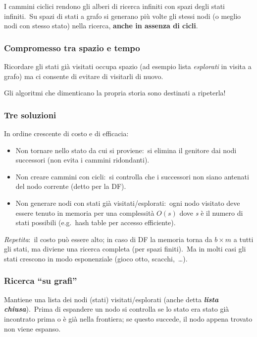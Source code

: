I cammini ciclici rendono gli alberi di ricerca infiniti con spazi degli stati infiniti.\
Su spazi di stati a grafo si generano più volte gli stessi nodi (o meglio nodi con stesso stato) nella ricerca, \textbf{anche in assenza di cicli}.\

\subsubsection{Compromesso tra spazio e tempo}
Ricordare gli stati già visitati occupa spazio (ad esempio lista \textit{esplorati} in visita a grafo) ma ci consente di evitare di visitarli di nuovo.\

Gli algoritmi che dimenticano la propria storia sono destinati a ripeterla!

\subsubsection{Tre soluzioni}

In ordine crescente di costo e di efficacia:
\begin{itemize}
	\item Non tornare nello stato da cui si proviene:\ si elimina il genitore dai nodi successori (non evita i cammini ridondanti).
	\item Non creare cammini con cicli:\ si controlla che i successori non siano antenati del nodo corrente (detto per la DF).
	\item Non generare nodi con stati già visitati{\slash}esplorati:\ ogni nodo visitato deve essere tenuto in memoria per una complessità $O(s)$ dove \textit{s} è il numero di stati possibili (e.g.\ hash table per accesso efficiente).
\end{itemize}
\textit{Repetita}:\ il costo può essere alto; in caso di DF la memoria torna da $b \times m$ a tutti gli stati, ma diviene una ricerca completa (per spazi finiti).\
Ma in molti casi gli stati crescono in modo esponenziale (gioco otto, scacchi,\ \dots).

\subsubsection{Ricerca ``su grafi''}

Mantiene una lista dei nodi (stati) visitati/esplorati (anche detta \textbf{\textit{lista chiusa}}).\
Prima di espandere un nodo si controlla se lo stato era stato già incontrato prima o è già nella frontiera; se questo succede, il nodo appena trovato non viene
espanso.\

